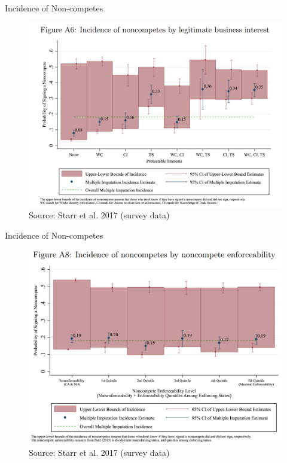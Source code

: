 \documentclass[english,usenames,dvipsnames]{beamer}
\begin{document}
\begin{frame}{Incidence of Non-competes}
\label{incidence_bi}
\hyperlink{theory_big_picture}{}
\begin{figure}
	\includegraphics[scale=0.37]{figures/nc_incidence_business_interest}
	\caption{Source: Starr et al. 2017 (survey data)}
\end{figure}
\end{frame}

\begin{frame}{Incidence of Non-competes}
\label{incidence_enforceability}
\hyperlink{empirical_work1}{}
\begin{figure}
	\includegraphics[scale=0.37]{figures/nc_incidence_enforceability}
	\caption{Source: Starr et al. 2017 (survey data)}
\end{figure}
\end{frame}
\end{document}
